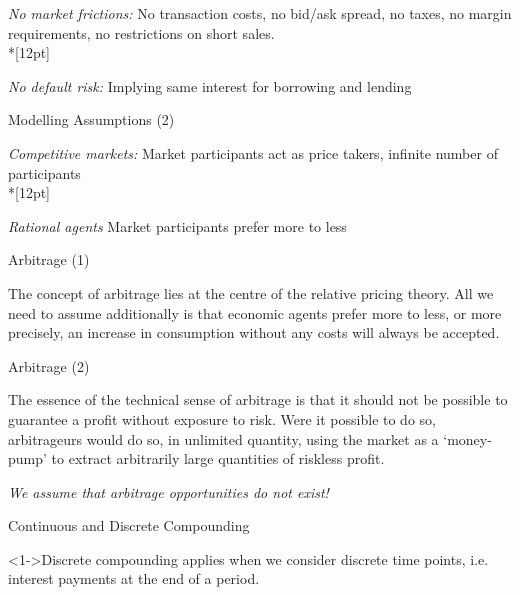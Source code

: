 



	{\it No market frictions: } No transaction costs, no bid/ask
spread, no taxes,
 no margin requirements, no restrictions on short sales.\\*[12pt]


	{\it No default risk:} Implying same interest for borrowing
and lending





{ Modelling Assumptions (2)}






	{\it Competitive markets:}  Market participants
act as price takers, infinite number of participants\\*[12pt]


	{\it Rational agents} Market
participants prefer more to less





{ Arbitrage (1)}






	The concept of arbitrage lies at
the centre of the relative pricing theory. All we need to assume additionally is
that economic agents prefer
more to less, or more precisely, an increase in consumption
without any costs will always be accepted.





{ Arbitrage (2)}






	The essence of the technical sense of arbitrage is that it should
not be possible to guarantee a profit without exposure to risk.
Were it possible to do so, arbitrageurs would do so, in unlimited quantity,
using the market as a \lq {money-pump}' to extract arbitrarily
large quantities of riskless profit.


	{\it We assume that arbitrage opportunities do not exist!}





{Continuous and Discrete Compounding}






	<1->Discrete compounding applies when we consider discrete time points, i.e. interest payments at the end of a period.\\


